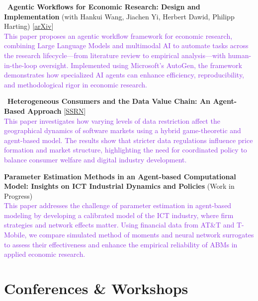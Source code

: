 \documentclass[a4paper,12pt]{article}
\begin{document}
\textbullet\ \textbf{Agentic Workflows for Economic Research: Design and Implementation} (with Hankui Wang, Jiachen Yi, Herbert Dawid, Philipp Harting) [\href{https://arxiv.org/abs/2504.09736}{arXiv}]\\ [1.5ex]
\textcolor{BlueViolet}{This paper proposes an agentic workflow framework for economic research, combining Large Language Models and multimodal AI to automate tasks across the research lifecycle—from literature review to empirical analysis—with human-in-the-loop oversight. Implemented using Microsoft’s AutoGen, the framework demonstrates how specialized AI agents can enhance efficiency, reproducibility, and methodological rigor in economic research.}

\textbullet\ \textbf{Heterogeneous Consumers and the Data Value Chain: An Agent-Based Approach} [\href{https://papers.ssrn.com/sol3/papers.cfm?abstract_id=5235196}{SSRN}]\\ [1.5ex]
\textcolor{BlueViolet}{This paper investigates how varying levels of data restriction affect the geographical dynamics of software markets using a hybrid game-theoretic and agent-based model. The results show that stricter data regulations influence price formation and market structure, highlighting the need for coordinated policy to balance consumer welfare and digital industry development.}

\textbullet \;\textbf{Parameter Estimation Methods in an Agent-based Computational Model: Insights on ICT Industrial Dynamics and Policies} (Work in Progress)\\ [1.5ex]
\textcolor{BlueViolet}{This paper addresses the challenge of parameter estimation in agent-based modeling by developing a calibrated model of the ICT industry, where firm strategies and network effects matter. Using financial data from AT\&T and T-Mobile, we compare simulated method of moments and neural network surrogates to assess their effectiveness and enhance the empirical reliability of ABMs in applied economic research.}

\section{Conferences \& Workshops}

\end{document}

